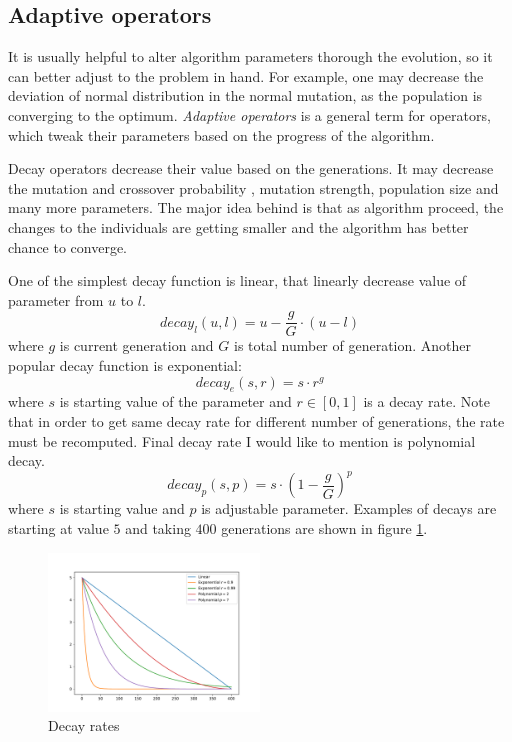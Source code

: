 \subsection{Adaptive operators}

It is usually helpful to alter algorithm parameters thorough the evolution, so it can better adjust to the problem in hand. For example, one may decrease the deviation of normal distribution in the normal mutation, as the population is converging to the optimum. \emph{Adaptive operators} is a general term for operators, which tweak their parameters based on the progress of the algorithm.

Decay operators decrease their value based on the generations. It may decrease the mutation and crossover probability \citep{DecayGA}, mutation strength, population size and many more parameters. The major idea behind is that as algorithm proceed, the changes to the individuals are getting smaller and the algorithm has better chance to converge.

One of the simplest decay function is linear, that linearly decrease value of parameter from $u$ to $l$.
$$
decay_l(u,l) = u - \frac{g}{G}\cdot\left( u - l \right)
$$
where $g$ is current generation and $G$ is total number of generation. Another popular decay function is exponential:
$$
decay_e(s,r) = s\cdot r^g
$$
where $s$ is starting value of the parameter and $r\in\left[0,1\right]$ is a decay rate. Note that in order to get same decay rate for different number of generations, the rate must be recomputed.
Final decay rate I would like to mention is polynomial decay.
$$
decay_p(s,p) = s \cdot\left(1 - \frac{g}{G}\right)^p
$$
where $s$ is starting value and $p$ is adjustable parameter. Examples of decays are starting at value $5$ and taking $400$ generations are shown in figure \ref{fig:decayrates}.

\begin{figure}
    \centering
    \includegraphics[width=0.5\textwidth]{img/render_decayrate.pdf}
    \caption{Decay rates}
    \label{fig:decayrates}
\end{figure}

